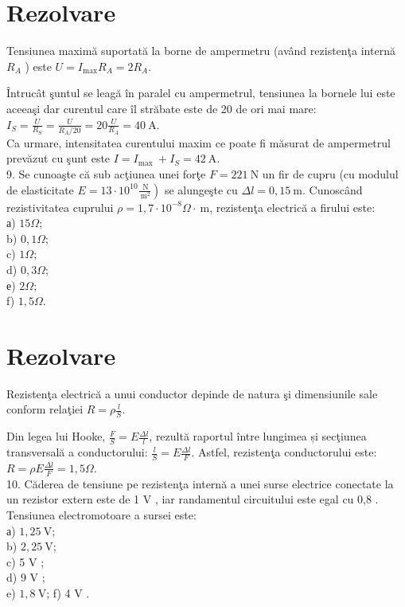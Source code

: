 \section*{Rezolvare}
Tensiunea maximă suportată la borne de ampermetru (având rezistenţa internă $R_{A}$ ) este $U=I_{\max } R_{A}=2 R_{A}$.

Întrucât şuntul se leagă în paralel cu ampermetrul, tensiunea la bornele lui este aceeaşi dar curentul care îl străbate este de 20 de ori mai mare:\\
$I_{S}=\frac{U}{R_{S}}=\frac{U}{R_{A} / 20}=20 \frac{U}{R_{A}}=40 \mathrm{~A}$.\\
Ca urmare, intensitatea curentului maxim ce poate fi măsurat de ampermetrul prevăzut cu şunt este $I=I_{\text {max }}+I_{S}=42 \mathrm{~A}$.\\
9. Se cunoaşte că sub acţiunea unei forţe $F=221 \mathrm{~N}$ un fir de cupru (cu modulul de elasticitate $\left.E=13 \cdot 10^{10} \frac{\mathrm{~N}}{\mathrm{~m}^{2}}\right)$ se alungeşte cu $\Delta l=0,15 \mathrm{~m}$. Cunoscând rezistivitatea cuprului $\rho=1,7 \cdot 10^{-8} \Omega \cdot \mathrm{~m}$, rezistenţa electrică a firului este:\\
а) $15 \Omega$;\\
b) $0,1 \Omega$;\\
c) $1 \Omega$;\\
d) $0,3 \Omega$;\\
е) $2 \Omega$;\\
f) $1,5 \Omega$.

\section*{Rezolvare}
Rezistenţa electrică a unui conductor depinde de natura şi dimensiunile sale conform relaţiei $R=\rho \frac{l}{S}$.

Din legea lui Hooke, $\frac{F}{S}=E \frac{\Delta l}{l}$, rezultă raportul între lungimea și secţiunea transversală a conductorului: $\frac{l}{S}=E \frac{\Delta l}{F}$. Astfel, rezistenţa conductorului este:\\
$R=\rho E \frac{\Delta l}{F}=1,5 \Omega$.\\
10. Căderea de tensiune pe rezistenţa internă a unei surse electrice conectate la un rezistor extern este de 1 V , iar randamentul circuitului este egal cu 0,8 . Tensiunea electromotoare a sursei este:\\
а) $1,25 \mathrm{~V}$;\\
b) $2,25 \mathrm{~V}$;\\
c) 5 V ;\\
d) 9 V ;\\
e) $1,8 \mathrm{~V}$; f) 4 V .

